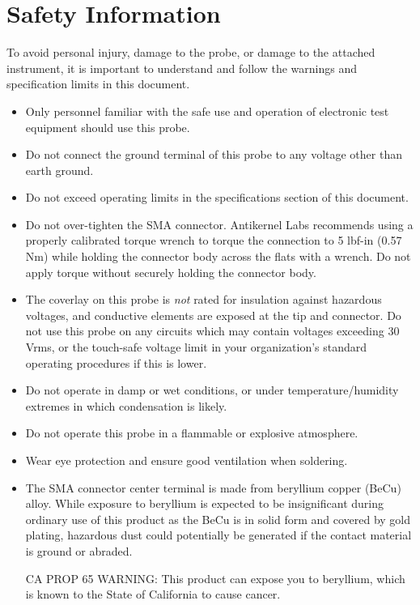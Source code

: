 \documentclass[11pt]{article}
\begin{document}
\pagebreak
\section{Safety Information}

To avoid personal injury, damage to the probe, or damage to the attached instrument, it is important to understand and
follow the warnings and specification limits in this document.

\begin{itemize}
\item Only personnel familiar with the safe use and operation of electronic test equipment should use this probe.
\item Do not connect the ground terminal of this probe to any voltage other than earth ground.
\item Do not exceed operating limits in the specifications section of this document.
\item Do not over-tighten the SMA connector. Antikernel Labs recommends using a properly calibrated torque wrench to
torque the connection to 5 lbf-in (0.57 Nm) while holding the connector body across the flats with a wrench. Do not
apply torque without securely holding the connector body.
\item The coverlay on this probe is \emph{not} rated for insulation against hazardous voltages, and conductive elements
are exposed at the tip and connector. Do not use this probe on any circuits which may contain voltages exceeding 30
Vrms, or the touch-safe voltage limit in your organization's standard operating procedures if this is lower.
\item Do not operate in damp or wet conditions, or under temperature/humidity extremes in which condensation is
likely.
\item Do not operate this probe in a flammable or explosive atmosphere.
\item Wear eye protection and ensure good ventilation when soldering.
\item The SMA connector center terminal is made from beryllium copper (BeCu) alloy. While exposure to beryllium is
expected to be insignificant during ordinary use of this product as the BeCu is in solid form and covered by gold
plating, hazardous dust could potentially be generated if the contact material is ground or abraded.

CA PROP 65 WARNING: This product can expose you to beryllium, which is known to the State of California to cause cancer.
\end{itemize}
\end{document}
